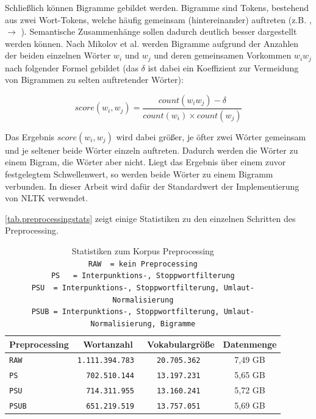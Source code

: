 Schließlich können Bigramme gebildet werden. Bigramme sind Tokens, bestehend aus zwei Wort-Tokens, welche häufig gemeinsam (hintereinander) auftreten (z.B. ,  $\rightarrow$ ). Semantische Zusammenhänge sollen dadurch deutlich besser dargestellt werden können. Nach Mikolov et al. \citep{Mikolov2013Dist} werden Bigramme aufgrund der Anzahlen der beiden einzelnen Wörter $w_i$ und $w_j$ und deren gemeinsamen Vorkommen $w_iw_j$ nach folgender Formel gebildet (das $\delta$ ist dabei ein Koeffizient zur Vermeidung von Bigrammen zu selten auftretender Wörter):

\begin{equation}
    score(w_i,w_j) = \frac{count(w_iw_j)-\delta}{count(w_i)\times count(w_j)} \label{eq.bigram}
\end{equation}

Das Ergebnis $score(w_i,w_j)$ wird dabei größer, je öfter zwei Wörter gemeinsam und je seltener beide Wörter einzeln auftreten. Dadurch werden die Wörter  zu einem Bigram, die Wörter  aber nicht. Liegt das Ergebnis über einem zuvor festgelegtem Schwellenwert, so werden beide Wörter zu einem Bigramm verbunden. In dieser Arbeit wird dafür der Standardwert der Implementierung von NLTK verwendet.

\autoref{tab.preprocessingstats} zeigt einige Statistiken zu den einzelnen Schritten des Preprocessing.

\begin{table}[!ht]\vspace{1ex}\small\centering{}\begin{tabular}{|l|c|c|c|}
\hline Preprocessing & Wortanzahl & Vokabulargröße & Datenmenge \\ \hline\hline
\tt{RAW}  & \tt{1.111.394.783}  & \tt{20.705.362} & 7,49 GB \\ \hline
\tt{PS}   & \tt{ \ 702.510.144} & \tt{13.197.231} & 5,65 GB \\ \hline
\tt{PSU}  & \tt{ \ 714.311.955} & \tt{13.160.241} & 5,72 GB \\ \hline
\tt{PSUB} & \tt{ \ 651.219.519} & \tt{13.757.051} & 5,69 GB \\ \hline
\end{tabular}
\caption[Korpus Preprocessing Statistiken]{\label{tab.preprocessingstats}Statistiken zum Korpus Preprocessing\\\tt{RAW } = kein Preprocessing\\\tt{PS \ } = Interpunktions-, Stoppwortfilterung\\\tt{PSU } = Interpunktions-, Stoppwortfilterung, Umlaut-Normalisierung\\\tt{PSUB} = Interpunktions-, Stoppwortfilterung, Umlaut-Normalisierung, Bigramme}
\vspace{1ex}\end{table}

